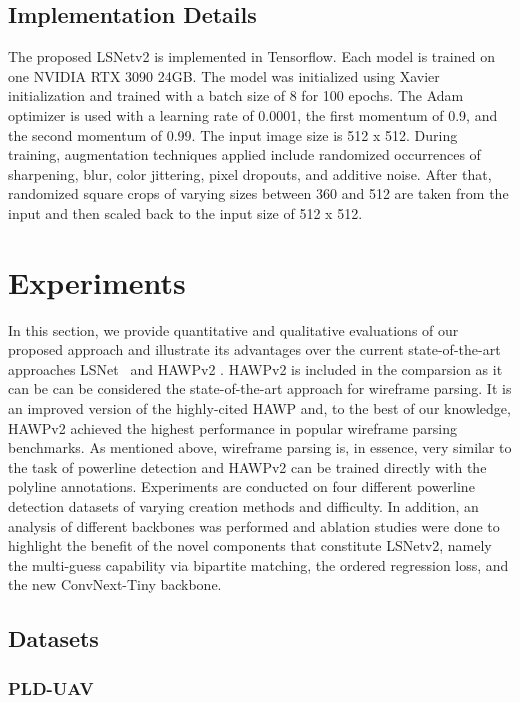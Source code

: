 \documentclass[journal]{IEEEtran}
\begin{document}
\subsection{Implementation Details}
The proposed LSNetv2 is implemented in Tensorflow. Each model is trained on one NVIDIA RTX 3090 24GB. The model was initialized using Xavier initialization \cite{xavier} and trained with a batch size of 8 for 100 epochs. The Adam optimizer \cite{adam} is used with a learning rate of 0.0001, the first momentum of 0.9, and the second momentum of 0.99. The input image size is 512 x 512. During training, augmentation techniques applied include randomized occurrences of sharpening, blur, color jittering, pixel dropouts, and additive noise. After that, randomized square crops of varying sizes between 360 and 512 are taken from the input and then scaled back to the input size of 512 x 512.

\section{Experiments}
In this section, we provide quantitative and qualitative evaluations of our proposed approach and illustrate its advantages over the current state-of-the-art approaches LSNet~\cite{Nguyen2020} and HAWPv2 \cite{hawpv2}. HAWPv2 is included in the comparsion as it can be can be considered the state-of-the-art approach for wireframe parsing. It is an improved version of the highly-cited HAWP and, to the best of our knowledge, HAWPv2 achieved the highest performance in popular wireframe parsing benchmarks. As mentioned above, wireframe parsing is, in essence, very similar to the task of powerline detection and HAWPv2 can be trained directly with the polyline annotations. Experiments are conducted on four different powerline detection datasets of varying creation methods and difficulty. In addition, an analysis of different backbones was performed and ablation studies were done to highlight the benefit of the novel components that constitute LSNetv2, namely the multi-guess capability via bipartite matching, the ordered regression loss, and the new ConvNext-Tiny backbone.

\subsection{Datasets}

\subsubsection{PLD-UAV}
\end{document}
